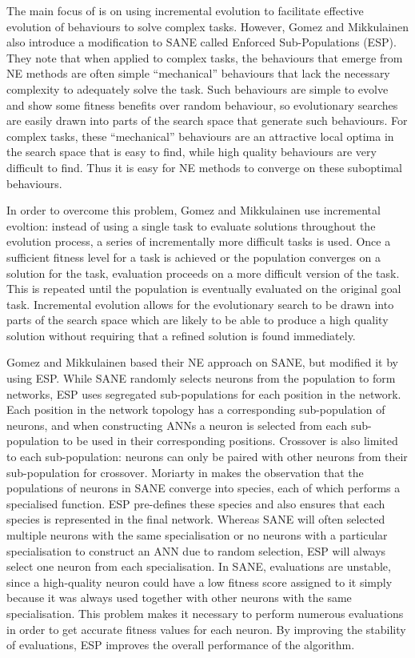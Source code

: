 \documentclass[12pt]{article} %
\begin{document}
The main focus of \cite{Gomez1997} is on using incremental evolution to facilitate effective evolution of behaviours to solve complex tasks. However, Gomez and Mikkulainen also introduce a modification to SANE called Enforced Sub-Populations (ESP). They note that when applied to complex tasks, the behaviours that emerge from NE methods are often simple ``mechanical'' behaviours that lack the necessary complexity to adequately solve the task. Such behaviours are simple to evolve and show some fitness benefits over random behaviour, so evolutionary searches are easily drawn into parts of the search space that generate such behaviours. For complex tasks, these ``mechanical'' behaviours are an attractive local optima in the search space that is easy to find, while high quality behaviours are very difficult to find. Thus it is easy for NE methods to converge on these suboptimal behaviours.

In order to overcome this problem, Gomez and Mikkulainen use incremental evoltion: instead of using a single task to evaluate solutions throughout the evolution process, a series of incrementally more difficult tasks is used. Once a sufficient fitness level for a task is achieved or the population converges on a solution for the task, evaluation proceeds on a more difficult version of the task. This is repeated until the population is eventually evaluated on the original goal task. Incremental evolution allows for the evolutionary search to be drawn into parts of the search space which are likely to be able to produce a high quality solution without requiring that a refined solution is found immediately.

Gomez and Mikkulainen based their NE approach on SANE, but modified it by using ESP. While SANE randomly selects neurons from the population to form networks, ESP uses segregated sub-populations for each position in the network. Each position in the network topology has a corresponding sub-population of neurons, and when constructing ANNs a neuron is selected from each sub-population to be used in their corresponding positions. Crossover is also limited to each sub-population: neurons can only be paired with other neurons from their sub-population for crossover. Moriarty in \cite{Moriarty1997} makes the observation that the populations of neurons in SANE converge into species, each of which performs a specialised function. ESP pre-defines these species and also ensures that each species is represented in the final network. Whereas SANE will often selected multiple neurons with the same specialisation or no neurons with a particular specialisation to construct an ANN due to random selection, ESP will always select one neuron from each specialisation. In SANE, evaluations are unstable, since a high-quality neuron could have a low fitness score assigned to it simply because it was always used together with other neurons with the same specialisation. This problem makes it necessary to perform numerous evaluations in order to get accurate fitness values for each neuron. By improving the stability of evaluations, ESP improves the overall performance of the algorithm.
\end{document}
